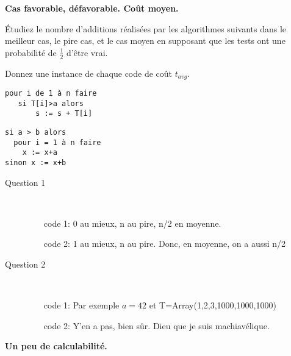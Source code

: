 \documentclass[10pt]{article}\usepackage[correction]{esial}
\begin{document}
\medskip
\Exercice \textbf{Cas favorable, défavorable. Coût moyen.}


\vspace{-.2\baselineskip}\noindent\begin{minipage}{.65\linewidth}

  \Question Étudiez le nombre d'additions réalisées par les algorithmes suivants
  dans le meilleur cas, le pire cas, et le cas moyen en supposant que les tests
  ont une probabilité de $\frac{1}{2}$ d'être vrai.

  \Question Donnez une instance de chaque code de coût $t_{avg}$.

\end{minipage}\hfill\begin{minipage}{.3\linewidth}
\vspace{-.7\baselineskip}
\begin{Verbatim}[label=code 1]
pour i de 1 à n faire
   si T[i]>a alors
       s := s + T[i]  
\end{Verbatim}

\begin{Verbatim}[label=code 2]
si a > b alors 
  pour i = 1 à n faire 
    x := x+a 
sinon x := x+b
\end{Verbatim}
\end{minipage}


\begin{Reponse}
  \begin{description}
  \item[Question 1] ~
    \begin{enumerate}
    \item[code 1:] 0 au mieux, n au pire, n/2 en moyenne. 
    \item[code 2:] 1 au mieux, n au pire. Donc, en moyenne, on a aussi n/2
    \end{enumerate}
  \item[Question 2] ~
    \begin{enumerate}
    \item[code 1:] Par exemple $a = 42$ et T=Array(1,2,3,1000,1000,1000)
    \item[code 2:] Y'en a pas, bien sûr. Dieu que je suis machiavélique.
    \end{enumerate}
  \end{description}
\end{Reponse}

\vspace{-.4\baselineskip}
\Exercice \textbf{Un peu de calculabilité.}  
\end{document}
